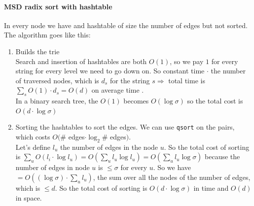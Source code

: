 \documentclass[10pt]{report}
\begin{document}
\paragraph{MSD radix sort with hashtable} In every node we have and hashtable of size the number of edges but not sorted. The algorithm goes like this:
\begin{enumerate}
	\item Builds the trie\\
	Search and insertion of hashtables are both $O(1)$, so we pay $1$ for every string for every level we need to go down on. So constant time $\cdot$ the number of traversed nodes, which is $d_s$ for the string $s\Rightarrow$ total time is $\sum_s O(1)\cdot d_s = O(d)$ on average time .\\
	In a binary search tree, the $O(1)$ becomes $O(\log\sigma)$ so the total cost is $O(d\cdot\log\sigma)$
	\item Sorting the hashtables to sort the edges. We can use \texttt{qsort} on the pairs, which costs $O(\#$ edges$\cdot\log_2\#$ edges$)$.\\
	Let's define $l_u$ the number of edges in the node $u$. So the total cost of sorting is $\sum_u O(l_i\cdot\log l_u)=O\left(\sum_u l_u\log l_u \right) = O\left(\sum_u l_u\log\sigma \right)$ because the number of edges in node $u$ is $\leq \sigma$ for every $u$. So we have $= O\left((\log\sigma)\cdot\sum_u l_u \right)$, the sum over all the nodes of the number of edges, which is $\leq d$. So the total cost of sorting is $O(d\cdot\log\sigma)$ in time and $O(d)$ in space.
\end{enumerate}
\end{document}
